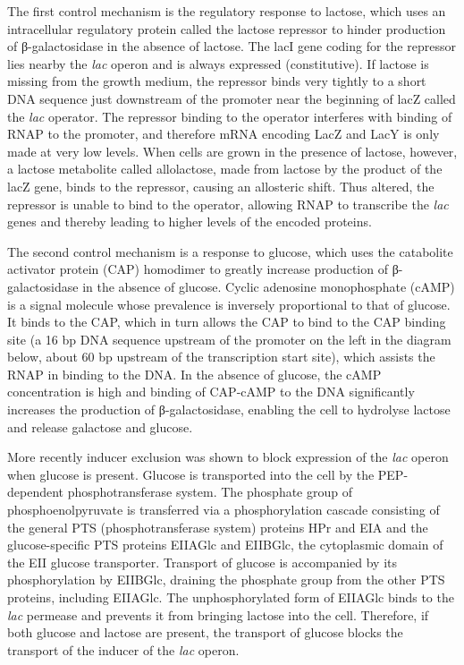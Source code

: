 The first control mechanism is the regulatory response to lactose, which uses an intracellular regulatory protein called the lactose repressor to hinder production of β-galactosidase in the absence of lactose. The lacI gene coding for the repressor lies nearby the \emph{lac} operon and is always expressed (constitutive). If lactose is missing from the growth medium, the repressor binds very tightly to a short DNA sequence just downstream of the promoter near the beginning of lacZ called the \emph{lac} operator. The repressor binding to the operator interferes with binding of RNAP to the promoter, and therefore mRNA encoding LacZ and LacY is only made at very low levels. When cells are grown in the presence of lactose, however, a lactose metabolite called allolactose, made from lactose by the product of the lacZ gene, binds to the repressor, causing an allosteric shift. Thus altered, the repressor is unable to bind to the operator, allowing RNAP to transcribe the \emph{lac} genes and thereby leading to higher levels of the encoded proteins.

The second control mechanism is a response to glucose, which uses the catabolite activator protein (CAP) homodimer to greatly increase production of β-galactosidase in the absence of glucose. Cyclic adenosine monophosphate (cAMP) is a signal molecule whose prevalence is inversely proportional to that of glucose. It binds to the CAP, which in turn allows the CAP to bind to the CAP binding site (a 16 bp DNA sequence upstream of the promoter on the left in the diagram below, about 60 bp upstream of the transcription start site), which assists the RNAP in binding to the DNA. In the absence of glucose, the cAMP concentration is high and binding of CAP-cAMP to the DNA significantly increases the production of β-galactosidase, enabling the cell to hydrolyse lactose and release galactose and glucose.

More recently inducer exclusion was shown to block expression of the \emph{lac} operon when glucose is present. Glucose is transported into the cell by the PEP-dependent phosphotransferase system. The phosphate group of phosphoenolpyruvate is transferred via a phosphorylation cascade consisting of the general PTS (phosphotransferase system) proteins HPr and EIA and the glucose-specific PTS proteins EIIAGlc and EIIBGlc, the cytoplasmic domain of the EII glucose transporter. Transport of glucose is accompanied by its phosphorylation by EIIBGlc, draining the phosphate group from the other PTS proteins, including EIIAGlc. The unphosphorylated form of EIIAGlc binds to the \emph{lac} permease and prevents it from bringing lactose into the cell. Therefore, if both glucose and lactose are present, the transport of glucose blocks the transport of the inducer of the \emph{lac} operon.

